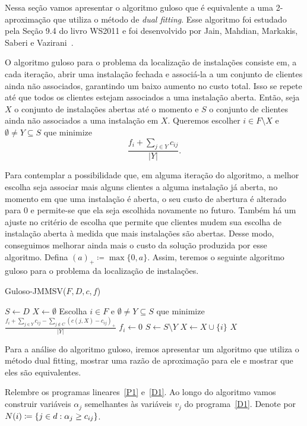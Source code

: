 Nessa seção vamos apresentar o algoritmo guloso que é equivalente a uma 2-aproximação que utiliza o método de \emph{dual fitting}. Esse algoritmo foi estudado pela Seção 9.4 do livro WS2011 e foi desenvolvido por Jain, Mahdian, Markakis, Saberi e Vazirani~\cite{jain2002greedy}.

O algoritmo guloso para o problema da localização de instalações consiste em, a cada iteração, abrir uma instalação fechada e associá-la a um conjunto de clientes ainda não associados, garantindo um baixo aumento no custo total. 
Isso se repete até que todos os clientes estejam associados a uma instalação aberta. Então, seja $X$ o conjunto de instalações abertas até o momento e $S$ o conjunto de clientes ainda não associados a uma instalação em $X$. Queremos escolher $i \in F \setminus X$ e $\emptyset \neq Y \subseteq S$ que minimize
\[ \frac{f_i + \sum_{j \in Y} c_{ij}}{|Y|}.
    \] 

Para contemplar a possibilidade que, em alguma iteração do algoritmo, a melhor escolha seja associar mais alguns clientes a alguma instalação já aberta, no momento em que uma instalação é aberta, o seu custo de abertura é alterado para 0 e permite-se que ela seja escolhida novamente no futuro. Também há um ajuste no critério de escolha que permite que clientes mudem sua escolha de instalação aberta à medida que mais instalações são abertas. Desse modo, conseguimos melhorar ainda mais o custo da solução produzida por esse algoritmo. Defina $(a)_+\coloneqq\max\{0,a\}$. Assim, teremos o seguinte algoritmo guloso para o problema da localização de instalações.
\begin{algorithm}
    \caption{\sc Guloso-JMMSV($F,D,c,f$)}
    \begin{algorithmic}[1]
        \State $S \gets D$
        \State $X \gets \emptyset$
        \State Escolha $i \in F$ e $\emptyset \neq Y \subseteq S$ que minimize $\frac{f_i + \sum_{j \in Y}c_{ij} - \sum_{j \not \in C}(c(j,X) - c_{ij})_+ }{|Y|}$
        \State $f_i \gets 0$
        \State $S \gets S \setminus Y$
        \State $X \gets X \cup \{i\}$
        \EndWhile
        \State \Return $X$
    \end{algorithmic}
\end{algorithm}

Para a análise do algoritmo guloso, iremos apresentar um algoritmo que utiliza o método dual fitting, mostrar uma razão de aproximação para ele e mostrar que eles são equivalentes.

Relembre os programas lineares~\eqref{P1} e~\eqref{D1}. Ao longo do algoritmo vamos construir variáveis $\alpha_j$ semelhantes às variáveis $v_j$ do programa~\eqref{D1}. Denote por ${N(i) \coloneqq \{j \in d : \alpha_j \geq c_{ij}\}}$.

